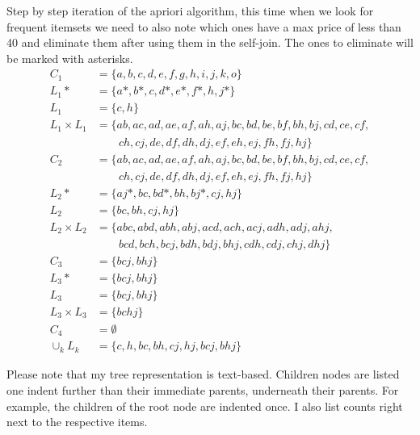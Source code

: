 \documentclass[newpage]{homework}
\begin{document}
\begin{alphaparts}
\questionpart
Step by step iteration of the apriori algorithm, this time when we look for frequent itemsets we need to also note which ones have a max price of less than 40 and eliminate them after using them in the self-join. The ones to eliminate will be marked with asterisks.
\begin{align*}
    C_1	&=	\{ a, b, c, d, e, f, g, h, i, j, k, o \}	\\
    L_1*	&=	\{ a*, b*, c, d*, e*, f*, h, j* \}	\\
    L_1	&=	\{ c, h \}	\\
    L_1 \times L_1	&=	\{ ab, ac, ad, ae, af, ah, aj, bc, bd, be, bf, bh, bj, cd, ce, cf, \\
                &\quad\quad ch, cj, de, df, dh, dj, ef, eh, ej, fh, fj, hj \}	\\
    C_2         &=	\{ ab, ac, ad, ae, af, ah, aj, bc, bd, be, bf, bh, bj, cd, ce, cf, \\
                &\quad\quad ch, cj, de, df, dh, dj, ef, eh, ej, fh, fj, hj \}	\\
    L_2*    &=	\{ aj*, bc, bd*, bh, bj*, cj, hj\}	\\
    L_2 &=  \{ bc, bh, cj, hj\}	\\
    L_2 \times L_2   &=  \{ abc, abd, abh, abj, acd, ach, acj, adh, adj, ahj, \\
                &\quad\quad bcd, bch, bcj, bdh, bdj, bhj, cdh, cdj, chj, dhj \} \\
    C_3 &=  \{ bcj, bhj \} \\
    L_3*    &=	\{ bcj, bhj \}	\\
    L_3    &=	\{ bcj, bhj \}	\\
    L_3 \times L_3   &=  \{ bchj \}   \\
    C_4 &=  \emptyset   \\
    \cup_k L_k &=   \boxed{\{c, h, bc, bh, cj, hj, bcj, bhj\}}
\end{align*}

\end{alphaparts}

\question
Please note that my tree representation is text-based. Children nodes are listed one indent further than their immediate parents, underneath their parents. For example, the children of the root node are indented once. I also list counts right next to the respective items.
\end{document}
